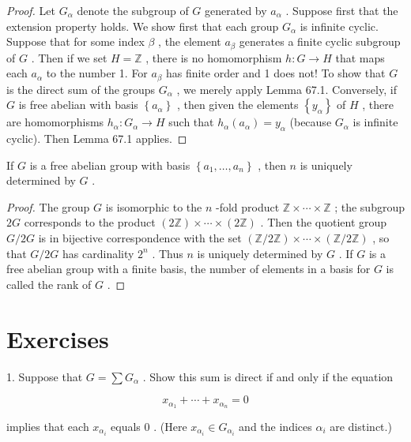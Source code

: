 \begin{proof}Let \({G}_{\alpha }\) denote the subgroup of \(G\) generated by \({a}_{\alpha }\) . Suppose first that the extension property holds. We show first that each group \({G}_{\alpha }\) is infinite cyclic. Suppose that for some index \(\beta\) , the element \({a}_{\beta }\) generates a finite cyclic subgroup of \(G\) . Then if we set \(H = \mathbb{Z}\) , there is no homomorphism \(h : G \rightarrow  H\) that maps each \({a}_{\alpha }\) to the number 1. For \({a}_{\beta }\) has finite order and 1 does not! To show that \(G\) is the direct sum of the groups \({G}_{\alpha }\) , we merely apply Lemma 67.1.
Conversely, if \(G\) is free abelian with basis \(\left\{  {a}_{\alpha }\right\}\) , then given the elements \(\left\{  {y}_{\alpha }\right\}\) of \(H\) , there are homomorphisms \({h}_{\alpha } : {G}_{\alpha } \rightarrow  H\) such that \({h}_{\alpha }\left( {a}_{\alpha }\right)  = {y}_{\alpha }\) (because \({G}_{\alpha }\) is infinite cyclic). Then Lemma 67.1 applies.
\end{proof}
\begin{theorem} If \(G\) is a free abelian group with basis \(\left\{  {{a}_{1},\ldots ,{a}_{n}}\right\}\) , then \(n\) is uniquely determined by \(G\) .
\end{theorem}

\begin{proof}The group \(G\) is isomorphic to the \(n\) -fold product \(\mathbb{Z} \times  \cdots  \times  \mathbb{Z}\) ; the subgroup \({2G}\) corresponds to the product \(\left( {2\mathbb{Z}}\right)  \times  \cdots  \times  \left( {2\mathbb{Z}}\right)\) . Then the quotient group \(G/{2G}\) is in bijective correspondence with the set \(\left( {\mathbb{Z}/2\mathbb{Z}}\right)  \times  \cdots  \times  \left( {\mathbb{Z}/2\mathbb{Z}}\right)\) , so that \(G/{2G}\) has cardinality \({2}^{n}\) . Thus \(n\) is uniquely determined by \(G\) .
If \(G\) is a free abelian group with a finite basis, the number of elements in a basis for \(G\) is called the rank of \(G\) .
\end{proof}
\section*{Exercises}

1. Suppose that \(G = \sum {G}_{\alpha }\) . Show this sum is direct if and only if the equation

\[
{x}_{{\alpha }_{1}} + \cdots  + {x}_{{\alpha }_{n}} = 0
\]

implies that each \({x}_{{\alpha }_{i}}\) equals 0 . (Here \({x}_{{\alpha }_{i}} \in  {G}_{{\alpha }_{i}}\) and the indices \({\alpha }_{i}\) are distinct.)

